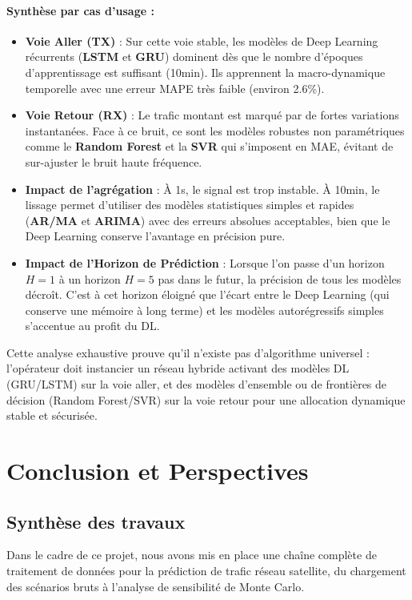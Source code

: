\documentclass[11pt,a4paper]{article}
\begin{document}
\paragraph{Synthèse par cas d'usage :}
\begin{itemize}
    \item \textbf{Voie Aller (TX)} : Sur cette voie stable, les modèles de Deep Learning récurrents (\textbf{LSTM} et \textbf{GRU}) dominent dès que le nombre d'époques d'apprentissage est suffisant (10min). Ils apprennent la macro-dynamique temporelle avec une erreur MAPE très faible (environ 2.6\%).
    \item \textbf{Voie Retour (RX)} : Le trafic montant est marqué par de fortes variations instantanées. Face à ce bruit, ce sont les modèles robustes non paramétriques comme le \textbf{Random Forest} et la \textbf{SVR} qui s'imposent en MAE, évitant de sur-ajuster le bruit haute fréquence.
    \item \textbf{Impact de l'agrégation} : À 1s, le signal est trop instable. À 10min, le lissage permet d'utiliser des modèles statistiques simples et rapides (\textbf{AR/MA} et \textbf{ARIMA}) avec des erreurs absolues acceptables, bien que le Deep Learning conserve l'avantage en précision pure.
    \item \textbf{Impact de l'Horizon de Prédiction} : Lorsque l'on passe d'un horizon $H=1$ à un horizon $H=5$ pas dans le futur, la précision de tous les modèles décroît. C'est à cet horizon éloigné que l'écart entre le Deep Learning (qui conserve une mémoire à long terme) et les modèles autorégressifs simples s'accentue au profit du DL.
\end{itemize}

Cette analyse exhaustive prouve qu'il n'existe pas d'algorithme universel : l'opérateur doit instancier un réseau hybride activant des modèles DL (GRU/LSTM) sur la voie aller, et des modèles d'ensemble ou de frontières de décision (Random Forest/SVR) sur la voie retour pour une allocation dynamique stable et sécurisée.


\section{Conclusion et Perspectives}
\label{sec:conclusion}
\subsection{Synthèse des travaux}
Dans le cadre de ce projet, nous avons mis en place une chaîne complète de traitement de données pour la prédiction de trafic réseau satellite, du chargement des scénarios bruts à l'analyse de sensibilité de Monte Carlo. 
\end{document}

